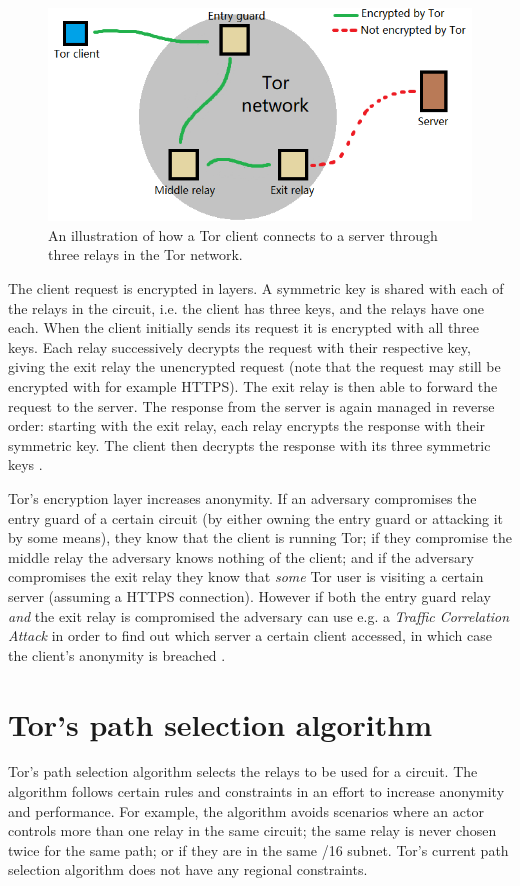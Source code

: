 \documentclass{kththesis}
\begin{document}
\begin{figure}[!htb]
    \centering
    \includegraphics[width=350pt]{resources/paint_tor_circuit.png}
    \caption{An illustration of how a Tor client connects to a server through three relays in the Tor network.}
    \label{fig:torCircuit}
\end{figure}

The client request is encrypted in layers. A symmetric key is shared with each of the relays in the circuit, i.e. the client has three keys, and the relays have one each. When the client initially sends its request it is encrypted with all three keys. Each relay successively decrypts the request with their respective key, giving the exit relay the unencrypted request (note that the request may still be encrypted with for example HTTPS). The exit relay is then able to forward the request to the server. The response from the server is again managed in reverse order: starting with the exit relay, each relay encrypts the response with their symmetric key. The client then decrypts the response with its three symmetric keys \parencite{TorOnionRouter}\parencite{UnderstandingTor}.

Tor's encryption layer increases anonymity. If an adversary compromises the entry guard of a certain circuit (by either owning the entry guard or attacking it by some means), they know that the client is running Tor; if they compromise the middle relay the adversary knows nothing of the client; and if the adversary compromises the exit relay they know that \emph{some} Tor user is visiting a certain server (assuming a HTTPS connection). However if both the entry guard relay \emph{and} the exit relay is compromised the adversary can use e.g. a \emph{Traffic Correlation Attack} \parencite{CLAPS} in order to find out which server a certain client accessed, in which case the client's anonymity is breached \parencite{TorOnionRouter}.

\section{Tor's path selection algorithm}
Tor's path selection algorithm \parencite{TorPathSpecification} selects the relays to be used for a circuit. The algorithm follows certain rules and constraints in an effort to increase anonymity and performance. For example, the algorithm avoids scenarios where an actor controls more than one relay in the same circuit; the same relay is never chosen twice for the same path; or if they are in the same /16 subnet. Tor's current path selection algorithm does not have any regional constraints.
\end{document}
